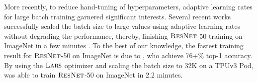 More recently, to reduce hand-tuning of hyperparameters, adaptive learning rates for large batch training garnered significant interests. Several recent works successfully scaled the batch size to large values using adaptive learning rates without degrading the performance, thereby, finishing $\textsc{ResNet}$-50 training on ImageNet in a few minutes \citep{you2018imagenet,iandola2016firecaffe,codreanu2017scale,akiba2017extremely,jia2018highly,smith2017don,martens2015optimizing,devarakonda2017adabatch,mikami2018imagenet,osawa2018second,you2019large,yamazaki2019yet}.
To the best of our knowledge, the fastest training result for $\textsc{ResNet}$-50 on ImageNet is due to \cite{ying2018image}, who achieve 76+\% top-1 accuracy. By using the $\textsc{Lars}$ optimizer and scaling the batch size to 32K  on a TPUv3 Pod, \citet{ying2018image} was able to train $\textsc{ResNet}$-50 on ImageNet in 2.2 minutes. 

\fi